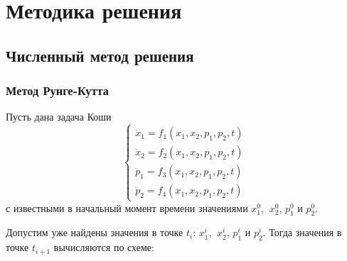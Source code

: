 \documentclass[a4paper,12pt]{article}
\begin{document}
\section*{Методика решения}

\subsection*{Численный метод решения}

\subsubsection*{Метод Рунге-Кутта}

Пусть дана задача Коши
\begin{equation*}
  \begin{cases} \dot{x}_1=f_1(x_1,x_2,p_1,p_2,t)\\ \dot{x}_2=f_2(x_1,x_2,p_1,p_2,t)\\ \dot{p}_1=f_3(x_1,x_2,p_1,p_2,t)\\ \dot{p}_2=f_4(x_1,x_2,p_1,p_2,t) \end{cases}
\end{equation*}
с известными в начальный момент времени значениями \(x_1^0\), \(\ x_2^0\), \(p_1^0\) и \(p_2^0\).

Допустим уже найдены значения в точке \(t_i\): \(x_1^i\), \(\ x_2^i\), \(p_1^i\) и \(p_2^i\). Тогда значения в точке \(t_{i+1}\) вычисляются по
схеме:
\end{document}
